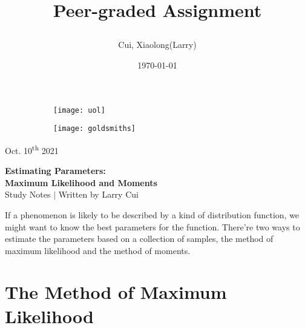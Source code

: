 \documentclass[11pt]{article}
\title{\vspace{-90pt} 



\textbf  {Peer-graded Assignment} }
\author{Cui, Xiaolong(Larry)}
\date{\today}
\begin{document}

\thispagestyle{plain}


\begin{figure}[H] %
  \begin{subfigure}{0.3\textwidth}
    \texttt{[image: uol]}
  \end{subfigure}
  \hfill
  \begin{subfigure}{0.3\textwidth}
    \texttt{[image: goldsmiths]}
  \end{subfigure}
\end{figure}


\begin{flushright}
\footnotesize {Oct. 10\textsuperscript{th} 2021}
\end{flushright}

\begin{center}
\textbf{Estimating Parameters: \\
Maximum Likelihood and Moments} \\
\footnotesize {Study Notes $ | $ Written by Larry Cui}
\end{center}





\setcounter{figure}{0}

\vspace{10pt}


If a phenomenon is likely to be described by a kind of distribution function,  we might want to know the best parameters for the function.  There're two ways to estimate the parameters based on a collection of samples,  the method of maximum likelihood and the method of moments. 


\section{\normalsize The Method of Maximum Likelihood}
\end{document}
